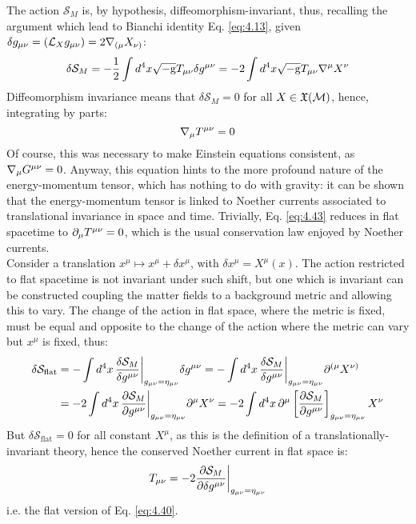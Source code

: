 The action $ \mathcal{S}_M $ is, by hypothesis, diffeomorphism-invariant, thus, recalling the argument which lead to Bianchi identity Eq. \ref{eq:4.13}, given $ \delta g_{\mu \nu} = (\mathcal{L}_X g_{\mu \nu}) = 2 \nabla_{(\mu} X_{\nu)} $:
\begin{equation*}
  \delta \mathcal{S}_M = - \frac{1}{2} \int d^4 x \sqrt{-\mathrm{g}} T_{\mu \nu} \delta g^{\mu \nu} = -2 \int d^4 x \sqrt{-\mathrm{g}} T_{\mu \nu} \nabla^\mu X^\nu
\end{equation*}
Diffeomorphism invariance means that $ \delta \mathcal{S}_M = 0 $ for all $ X \in \mathfrak{X}(\mathcal{M}) $, hence, integrating by parts:
\begin{equation}
  \nabla_\mu T^{\mu \nu} = 0
  \label{eq:4.43}
\end{equation}
Of course, this was necessary to make Einstein equations consistent, as $ \nabla_\mu G^{\mu \nu} = 0 $. Anyway, this equation hints to the more profound nature of the energy-momentum tensor, which has nothing to do with gravity: it can be shown that the energy-momentum tensor is linked to Noether currents associated to translational invariance in space and time. Trivially, Eq. \ref{eq:4.43} reduces in flat spacetime to $ \partial_\mu T^{\mu \nu} = 0 $, which is the usual conservation law enjoyed by Noether currents.\\
Consider a translation $ x^\mu \mapsto x^\mu + \delta x^\mu $, with $ \delta x^\mu = X^\mu(x) $. The action restricted to flat spacetime is not invariant under such shift, but one which is invariant can be constructed coupling the matter fields to a background metric and allowing this to vary. The change of the action in flat space, where the metric is fixed, must be equal and opposite to the change of the action where the metric can vary but $ x^\mu $ is fixed, thus:
\begin{equation*}
  \begin{split}
    \delta \mathcal{S}_{\text{flat}}
    &= - \int d^4 x\, \frac{\delta \mathcal{S}_M}{\delta g^{\mu \nu}} \bigg\vert_{g_{\mu \nu} = \eta_{\mu \nu}} \delta g^{\mu \nu} = - \int d^4 x\, \frac{\delta \mathcal{S}_M}{\delta g^{\mu \nu}} \bigg\vert_{g_{\mu \nu} = \eta_{\mu \nu}} \partial^{(\mu} X^{\nu)} \\
    &= - 2 \int d^4 x\, \frac{\partial \mathcal{S}_M}{\partial g^{\mu \nu}} \bigg\vert_{g_{\mu \nu} = \eta_{\mu \nu}} \partial^\mu X^\nu = - 2 \int d^4 x\, \partial^\mu \left[ \frac{\partial \mathcal{S}_M}{\partial g^{\mu \nu}} \right]_{g_{\mu \nu} = \eta_{\mu \nu}} X^\nu
  \end{split}
\end{equation*}
But $ \delta \mathcal{S}_{\text{flat}} = 0 $ for all constant $ X^\mu $, as this is the definition of a translationally-invariant theory, hence the conserved Noether current in flat space is:
\begin{equation*}
  T_{\mu \nu} = - 2 \frac{\partial \mathcal{S}_M}{\partial \delta g^{\mu \nu}} \bigg\vert_{g_{\mu \nu} = \eta_{\mu \nu}}
\end{equation*}
i.e. the flat version of Eq. \ref{eq:4.40}.

